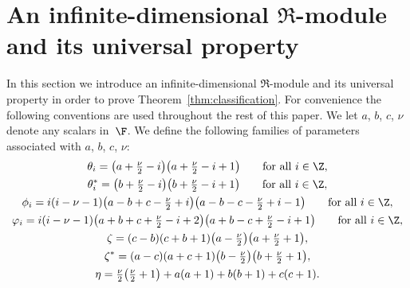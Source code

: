 \section[An infinite-dimensional $\Re$-module and its universal property]{An infinite-dimensional $\boldsymbol{\Re}$-module and its universal property}\label{s:Verma}

In this section we introduce an infinite-dimensional $\Re$-module and its universal property in order to prove Theorem~\ref{thm:classification}. For convenience the following conventions are used throughout the rest of this paper. We let $a$, $b$, $c$, $\nu$ denote any scalars in~$\F$. We define the following families of parameters associated with $a$, $b$, $c$, $\nu$:
\begin{gather}
\theta_i =\big(a+\textstyle\frac{\nu}{2}-i\big)\big(a+\textstyle\frac{\nu}{2}-i+1\big)\qquad \hbox{for all $i\in \Z$}, \label{theta_i}\\
\theta^*_i=\big(b+\textstyle\frac{\nu}{2}-i\big)\big(b+\textstyle\frac{\nu}{2}-i+1\big)\qquad\hbox{for all $i\in \Z$}, \label{theta_is}\\
\phi_i=i(i-\nu-1)\big(a-b+c-\textstyle\frac{\nu}{2}+i\big)\big(a-b-c-\textstyle\frac{\nu}{2}+i-1\big)\qquad
\hbox{for all $i\in \Z$},\label{phi_i}\\
\varphi_i=i(i-\nu-1)\big(a+b+c+\textstyle\frac{\nu}{2}-i+2\big)\big(a+b-c+\textstyle\frac{\nu}{2}-i+1\big)
\qquad\hbox{for all $i\in \Z$},\label{varphi_i}\\
\zeta=(c-b)(c+b+1)\big(a-\textstyle\frac{\nu}{2}\big)\big(a+\textstyle\frac{\nu}{2}+1\big),\label{omega}\\
\zeta^*=(a-c)(a+c+1)\big(b-\textstyle\frac{\nu}{2}\big)\big(b+\textstyle\frac{\nu}{2}+1\big),\label{omages}\\
\eta=\textstyle\frac{\nu}{2} \big(\textstyle\frac{\nu}{2}+1\big)+a(a+1)+b(b+1)+c(c+1).\label{eta}
\end{gather}

